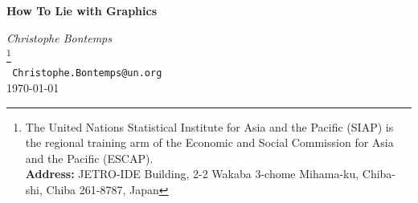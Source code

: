 \documentclass[11pt,twoside,a4paper]{article}
\begin{document}
\begin{center}
\Large{ \textbf{How To Lie with Graphics}} \\ 
\vspace{0.2cm}
\vspace{0.5cm}

 \textit{Christophe Bontemps}\\ %
  \footnote{The United Nations Statistical Institute for Asia and the Pacific (SIAP) is the regional training arm of the Economic and Social Commission for Asia and the Pacific (ESCAP).\\
 \noindent \textbf{Address:}  JETRO-IDE Building, 2-2 Wakaba 3-chome Mihama-ku, Chiba-shi, Chiba 261-8787, Japan  }\\

\vspace{0.5cm}
\texttt{\normalsize{ Christophe.Bontemps@un.org}}\\ 
\vspace{0.5cm}
\footnotesize{\today}
\end{center}

\vspace{0.1cm} 
\end{document}
